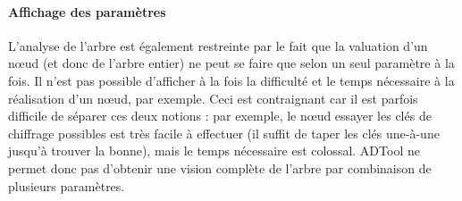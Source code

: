 	\paragraph{Affichage des paramètres} L'analyse de l'arbre est également restreinte par le fait que la valuation d'un nœud (et donc de l'arbre entier) ne peut se faire que selon un seul paramètre à la fois. Il n'est pas possible d'afficher à la fois la \og difficulté \fg{} et le \og temps nécessaire \fg{} à la réalisation d'un nœud, par exemple. Ceci est contraignant car il est parfois difficile de séparer ces deux notions : par exemple, le nœud \og essayer les clés de chiffrage possibles \fg{} est très facile à effectuer (il suffit de taper les clés une-à-une jusqu'à trouver la bonne), mais le temps nécessaire est colossal. ADTool ne permet donc pas d'obtenir une vision complète de l'arbre par combinaison de plusieurs paramètres.
	 
	 
	 
